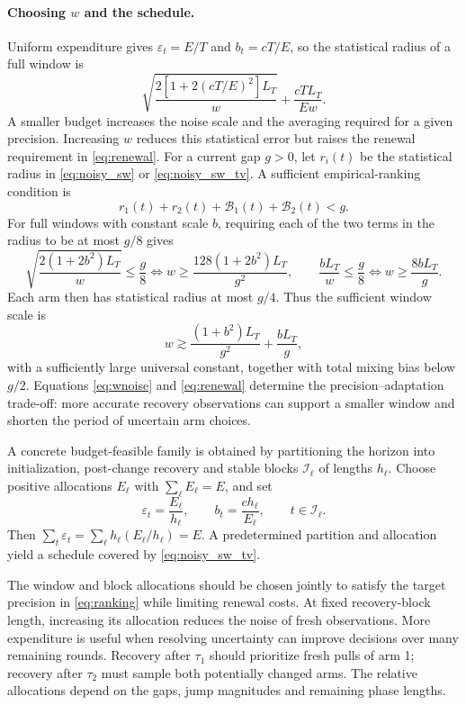 \paragraph{Choosing $w$ and the schedule.} Uniform expenditure gives $\varepsilon_t=E/T$ and $b_t=cT/E$, so the statistical radius of a full window is
\begin{equation}\label{eq:uniform}
\sqrt{\frac{2[1+2(cT/E)^2]L_T}w}+\frac{cTL_T}{Ew}.
\end{equation}
A smaller budget increases the noise scale and the averaging required for a given precision. Increasing $w$ reduces this statistical error but raises the renewal requirement in \eqref{eq:renewal}. For a current gap $g>0$, let $r_i(t)$ be the statistical radius in \eqref{eq:noisy_sw} or \eqref{eq:noisy_sw_tv}. A sufficient empirical-ranking condition is
\begin{equation}\label{eq:ranking}
r_1(t)+r_2(t)+\mathcal B_1(t)+\mathcal B_2(t)<g.
\end{equation}
For full windows with constant scale $b$, requiring each of the two terms in the radius to be at most $g/8$ gives
\[
\sqrt{\frac{2(1+2b^2)L_T}w}\le\frac g8\iff w\ge\frac{128(1+2b^2)L_T}{g^2},\qquad \frac{bL_T}w\le\frac g8\iff w\ge\frac{8bL_T}g.
\]
Each arm then has statistical radius at most $g/4$. Thus the sufficient window scale is
\begin{equation}\label{eq:wnoise}
w\gtrsim\frac{(1+b^2)L_T}{g^2}+\frac{bL_T}g,
\end{equation}
with a sufficiently large universal constant, together with total mixing bias below $g/2$. Equations \eqref{eq:wnoise} and \eqref{eq:renewal} determine the precision--adaptation trade-off: more accurate recovery observations can support a smaller window and shorten the period of uncertain arm choices.

A concrete budget-feasible family is obtained by partitioning the horizon into initialization, post-change recovery and stable blocks $\mathcal I_\ell$ of lengths $h_\ell$. Choose positive allocations $E_\ell$ with $\sum_\ell E_\ell=E$, and set
\begin{equation}\label{eq:blocks}
\varepsilon_t=\frac{E_\ell}{h_\ell},\qquad b_t=\frac{ch_\ell}{E_\ell},\qquad t\in\mathcal I_\ell.
\end{equation}
Then $\sum_t\varepsilon_t=\sum_\ell h_\ell(E_\ell/h_\ell)=E$. A predetermined partition and allocation yield a schedule covered by \eqref{eq:noisy_sw_tv}.

The window and block allocations should be chosen jointly to satisfy the target precision in \eqref{eq:ranking} while limiting renewal costs. At fixed recovery-block length, increasing its allocation reduces the noise of fresh observations. More expenditure is useful when resolving uncertainty can improve decisions over many remaining rounds. Recovery after $\tau_1$ should prioritize fresh pulls of arm 1; recovery after $\tau_2$ must sample both potentially changed arms. The relative allocations depend on the gaps, jump magnitudes and remaining phase lengths.


